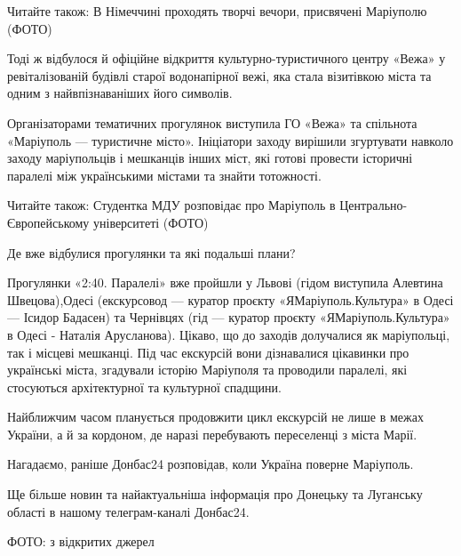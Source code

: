Читайте також: В Німеччині проходять творчі вечори, присвячені Маріуполю (ФОТО)

Тоді ж відбулося й офіційне відкриття культурно-туристичного центру «Вежа» у
ревіталізованій будівлі старої водонапірної вежі, яка стала візитівкою міста та
одним з найвпізнаваніших його символів.

Організаторами тематичних прогулянок виступила ГО «Вежа» та спільнота
«Маріуполь — туристичне місто». Ініціатори заходу вирішили згуртувати навколо
заходу маріупольців і мешканців інших міст, які готові провести історичні
паралелі між українськими містами та знайти тотожності.

Читайте також: Студентка МДУ розповідає про Маріуполь в
Центрально-Європейському університеті (ФОТО)

Де вже відбулися прогулянки та які подальші плани?

Прогулянки «2:40. Паралелі» вже пройшли у Львові (гідом виступила Алевтина
Швецова),Одесі (екскурсовод — куратор проєкту «ЯМаріуполь.Культура» в Одесі —
Ісидор Бадасен) та Чернівцях (гід — куратор проєкту «ЯМаріуполь.Культура» в
Одесі - Наталія Арусланова). Цікаво, що до заходів долучалися як маріупольці,
так і місцеві мешканці. Під час екскурсій вони дізнавалися цікавинки про
українські міста, згадували історію Маріуполя та проводили паралелі, які
стосуються архітектурної та культурної спадщини.

Найближчим часом планується продовжити цикл екскурсій не лише в межах України,
а й за кордоном, де наразі перебувають переселенці з міста Марії.

Нагадаємо, раніше Донбас24 розповідав, коли Україна поверне Маріуполь.

Ще більше новин та найактуальніша інформація про Донецьку та Луганську області
в нашому телеграм-каналі Донбас24.

ФОТО: з відкритих джерел
